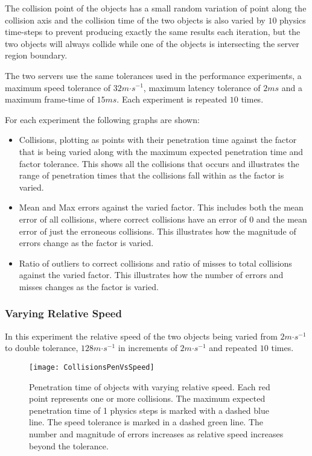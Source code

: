 The collision point of the objects has a small random variation of point along the collision axis and the collision time of the two objects is also varied by $10$ physics time-steps to prevent producing exactly the same results each iteration, but the two objects will always collide while one of the objects is intersecting the server region boundary.

The two servers use the same tolerances used in the performance experiments, a maximum speed tolerance of $32m\mathord{\cdot}s^{-1}$, maximum latency tolerance of $2ms$ and a maximum frame-time of $15ms$. Each experiment is repeated $10$ times.

For each experiment the following graphs are shown:
\begin{itemize}
	\item Collisions, plotting as points with their penetration time against the factor that is being varied along with the maximum expected penetration time and factor tolerance. This shows all the collisions that occurs and illustrates the range of penetration times that the collisions fall within as the factor is varied. %
	\item Mean and Max errors against the varied factor. This includes both the mean error of all collisions, where correct collisions have an error of $0$ and the mean error of just the erroneous collisions. This illustrates how the magnitude of errors change as the factor is varied.
	\item Ratio of outliers to correct collisions and ratio of misses to total collisions against the varied factor. This illustrates how the number of errors and misses changes as the factor is varied.
\end{itemize}


\subsubsection{Varying Relative Speed}

In this experiment the relative speed of the two objects being varied from $2m\mathord{\cdot}s^{-1}$ to double tolerance, $128m\mathord{\cdot}s^{-1}$ in increments of $2m\mathord{\cdot}s^{-1}$ and repeated $10$ times.

\begin{figure}
	\centering
	\texttt{[image: CollisionsPenVsSpeed]}
	\caption{Penetration time of objects with varying relative speed. Each red point represents one or more collisions. The maximum expected penetration time of 1 physics steps is marked with a dashed blue line. The speed tolerance is marked in a dashed green line. The number and magnitude of errors increases as relative speed increases beyond the tolerance.}
	\label{fig_CollisionsPenVsSpeed}
\end{figure}

